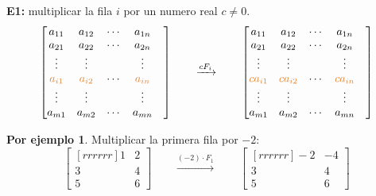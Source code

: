 \documentclass{article}
\theoremstyle{definition}
\theoremstyle{definition}
\newtheorem*{ej}{Por ejemplo}
\theoremstyle{remark}
\begin{document}
\textbf{E1:} multiplicar la fila $i$ por un numero real $c \neq 0$. 
\[
  \begin{bmatrix}
  a_{11} &   a_{12}    & \cdots & a_{1n}   \\ 
  a_{21} &   a_{22}    & \cdots & a_{2n}   \\ 
\vdots & \vdots & & \vdots & \\
\textcolor{rojop2}{a_{i1}} & \textcolor{rojop2}{a_{i2}} & \cdots  &  \textcolor{rojop2}{a_{in}} \\
\vdots & \vdots & & \vdots & \\
  a_{m1} &   a_{m2}    & \cdots & a_{mn}   \\ 
  \end{bmatrix}  \quad \quad \xrightarrow{cF_i} \quad \quad \begin{bmatrix}
      a_{11} &   a_{12}    & \cdots & a_{1n}   \\ 
  a_{21} &   a_{22}    & \cdots & a_{2n}   \\ 
\vdots & \vdots & & \vdots & \\
\textcolor{rojop2}{c  a_{i1}} & \textcolor{rojop2}{c  a_{i2}} & \cdots  &  \textcolor{rojop2}{c  a_{in}} \\
\vdots & \vdots & & \vdots & \\
  a_{m1} &   a_{m2}    & \cdots & a_{mn}   \\ 
  \end{bmatrix}
\]
\begin{ej}
  Multiplicar la primera fila por $-2$: \[
    \begin{bmatrix}[rrrrrr]
      1 & 2 \\
      3 & 4 \\
      5 & 6
    \end{bmatrix} 
    \quad \quad \xrightarrow{(-2)\cdot F_{1}} \quad \quad \begin{bmatrix}[rrrrrr]
      -2 & -4 \\
      3 & 4 \\
      5 & 6
    \end{bmatrix}
  \]
\end{ej}
\pagebreak
\end{document}

